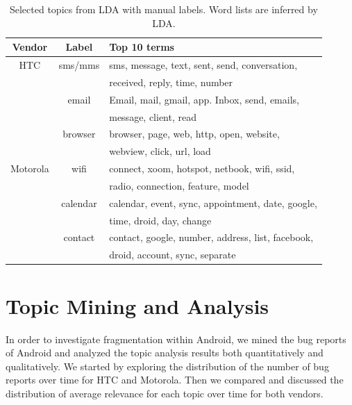 \documentclass[10pt, conference, compsocconf]{IEEEtran}
\begin{document}
\begin{table}[!t]
\renewcommand{\arraystretch}{1.3}
\caption{Selected topics from LDA with manual labels. Word lists are inferred by LDA.}
\label{seleted2}
\centering
\begin{tabular}{|c||c||l|}
\hline
Vendor & Label & Top 10 terms\\
\hline
HTC & sms\//mms &sms, message, text, sent, send, conversation, \\
            && received, reply, time, number \\ \cline{2-3}
  & email & Email, mail, gmail, app. Inbox, send, emails, \\
            &&message, client, read \\ \cline{2-3}
  & browser&browser, page, web, http, open, website, \\
            &&webview, click, url, load\\
\hline
Motorola & wifi &connect, xoom, hotspot, netbook, wifi, ssid, \\
           &&radio, connection, feature, model\\ \cline{2-3}
    &calendar& calendar, event, sync, appointment, date, google, \\
           &&time, droid, day, change \\ \cline{2-3}
    &contact & contact, google, number, address, list, facebook, \\
           &&droid, account, sync, separate \\
\hline
\end{tabular}
\end{table}


\section{Topic Mining and Analysis}
\label{sec:topicanalysis}

In order to investigate fragmentation within Android, we mined the bug
reports of Android and analyzed the topic analysis results both
quantitatively and qualitatively.
We started by exploring the distribution of the number of bug reports
over time for HTC and Motorola. Then we compared and discussed the
distribution of average relevance for each topic over time for both
vendors.
\end{document}
